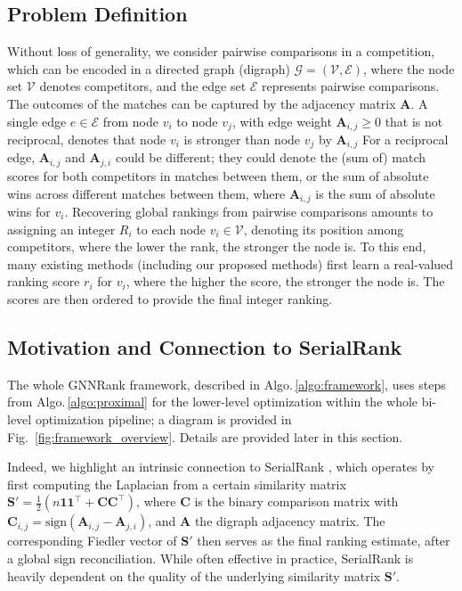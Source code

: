 \documentclass[nohyperref]{article}
\theoremstyle{plain}
\theoremstyle{definition}
\theoremstyle{remark}
\begin{document}
\subsection{Problem Definition}
Without loss of generality, we consider pairwise comparisons in a competition, which can be encoded in a directed graph (digraph) $\mathcal{G}=(\mathcal{V}, \mathcal{E})$, where the node set $\mathcal{V}$ denotes competitors, and the edge set $\mathcal{E}$ represents pairwise comparisons. The outcomes of the matches can be captured by the adjacency matrix $\mathbf{A}$. 
A single edge $e\in\mathcal{E}$ from node $v_i$ to node $v_j$, with edge weight $\mathbf{A}_{i,j}\geq 0$ that is not reciprocal, denotes that node $v_i$ is stronger than node $v_j$ by $\mathbf{A}_{i,j}$
For a reciprocal edge, $\mathbf{A}_{i,j}$ and $\mathbf{A}_{j,i}$ could be different; 
they could denote the (sum of) match scores for both competitors in matches between them, or the sum of absolute wins across different matches between them, where $\mathbf{A}_{i,j}$ is the sum of absolute wins for $v_i.$
Recovering global rankings from pairwise comparisons amounts to assigning an integer $R_i$ to each node $v_i\in\mathcal{V}$, denoting its position among competitors, where the lower the rank, the stronger the node is. To this end, many existing methods (including our proposed methods) first learn a real-valued ranking score $r_i$ for $v_i$, where the higher the score, the stronger the node is. The scores are then ordered to provide the final integer ranking.

\subsection{Motivation and Connection to SerialRank}
\label{subsec:overview}
The whole GNNRank framework, described in Algo.\,\ref{algo:framework}, uses steps from Algo.\,\ref{algo:proximal} for the lower-level optimization within the whole bi-level optimization pipeline; 
a diagram is provided in Fig.~\ref{fig:framework_overview}. Details are provided later in this section.

Indeed, we highlight an intrinsic connection to SerialRank \cite{fogel2014SerialRank}, which operates by  first computing the Laplacian from a certain similarity matrix $\mathbf{S}'=\frac{1}{2}(n\mathbf{1}\mathbf{1}^\top + \mathbf{C}\mathbf{C}^\top)$, where $\mathbf{C}$ is the binary comparison matrix with $\mathbf{C}_{i,j}=\text{sign}(\mathbf{A}_{i,j}-\mathbf{A}_{j,i})$,
and $\mathbf{A}$ the
digraph adjacency matrix. The corresponding Fiedler vector of $\mathbf{S}'$ 
then serves as the final ranking estimate, after a global sign reconciliation. While often effective in practice, SerialRank is heavily dependent on the quality of the underlying similarity matrix $\mathbf{S}'$.
\end{document}

